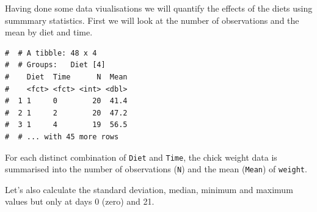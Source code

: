 \documentclass[a4paper,9pt,twocolumn,twoside,printwatermark=false]{pinp}
\begin{document}
Having done some data viualisations we will quantify the effects of the
diets using summmary statistics. First we will look at the number of
observations and the mean by diet and time.

\begin{Shaded}
\end{Shaded}

\begin{ShadedResult}
\begin{verbatim}
#  # A tibble: 48 x 4
#  # Groups:   Diet [4]
#    Diet  Time      N  Mean
#    <fct> <fct> <int> <dbl>
#  1 1     0        20  41.4
#  2 1     2        20  47.2
#  3 1     4        19  56.5
#  # ... with 45 more rows
\end{verbatim}
\end{ShadedResult}

For each distinct combination of \texttt{Diet} and \texttt{Time}, the
chick weight data is summarised into the number of observations
(\texttt{N}) and the mean (\texttt{Mean}) of \texttt{weight}.

Let's also calculate the standard deviation, median, minimum and maximum
values but only at days 0 (zero) and 21.

\begin{Shaded}
\end{Shaded}
\end{document}
